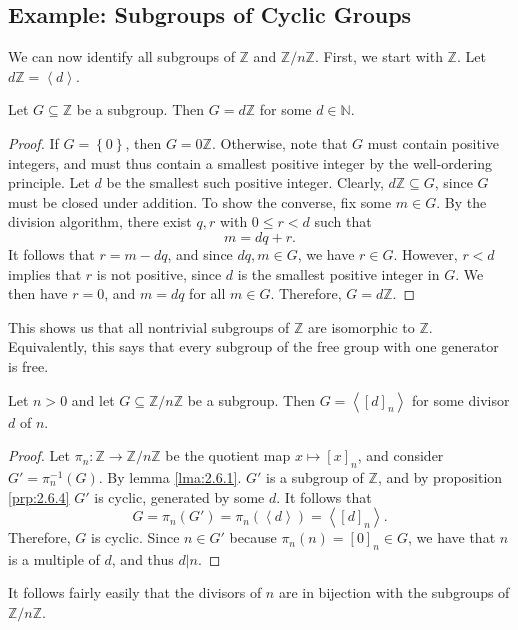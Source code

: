 \subsection{Example: Subgroups of Cyclic Groups}
We can now identify all subgroups of $\mathbb{Z}$ and $\mathbb{Z}/n\mathbb{Z}$. First, we start with $\mathbb{Z}$. Let $d\mathbb{Z}=\left\langle d \right\rangle $.
\begin{proposition}\label{prp:2.6.4}
	Let $G\subseteq \mathbb{Z}$ be a subgroup. Then $G=d\mathbb{Z}$ for some $d\in\mathbb{N}$.
\end{proposition}
\begin{proof}
	If $G=\left\{ 0 \right\} $, then $G=0\mathbb{Z}$. Otherwise, note that $G$ must contain positive integers, and must thus contain a smallest positive integer by the well-ordering principle. Let $d$ be the smallest such positive integer. Clearly, $d\mathbb{Z}\subseteq G$, since $G$ must be closed under addition. To show the converse, fix some $m\in G$. By the division algorithm, there exist $q,r$ with $0\leq r<d$ such that
	\[
		m=dq+r
	.\]
	It follows that $r=m-dq$, and since $dq,m\in G$, we have $r\in G$. However, $r<d$ implies that $r$ is not positive, since $d$ is the smallest positive integer in $G$. We then have $r=0$, and $m=dq$ for all $m\in G$. Therefore, $G=d\mathbb{Z}$.
\end{proof}
This shows us that all nontrivial subgroups of $\mathbb{Z}$ are isomorphic to $\mathbb{Z}$. Equivalently, this says that every subgroup of the free group with one generator is free.
\begin{proposition}\label{prp:2.6.5}
	Let $n>0$ and let $G\subseteq \mathbb{Z}/n\mathbb{Z}$ be a subgroup. Then $G=\left\langle [d]_n \right\rangle $ for some divisor $d$ of $n$.
\end{proposition}
\begin{proof}
	Let $\pi_n : \mathbb{Z} \to \mathbb{Z}/n\mathbb{Z}$ be the quotient map $x\mapsto [x]_n$, and consider $G'=\pi_n ^{-1}(G) $. By lemma \ref{lma:2.6.1}. $G'$ is a subgroup of $\mathbb{Z}$, and by proposition \ref{prp:2.6.4} $G'$ is cyclic, generated by some $d$. It follows that
	 \[
		 G=\pi_n(G')=\pi_n(\left\langle d \right\rangle)=\left\langle [d]_n \right\rangle 
	.\]
	Therefore, $G$ is cyclic. Since $n\in G'$ because $\pi_n(n)=[0]_n\in G$, we have that $n$ is a multiple of $d$, and thus $d|n$.
\end{proof}
It follows fairly easily that the divisors of $n$ are in bijection with the subgroups of $\mathbb{Z}/n\mathbb{Z}$.

